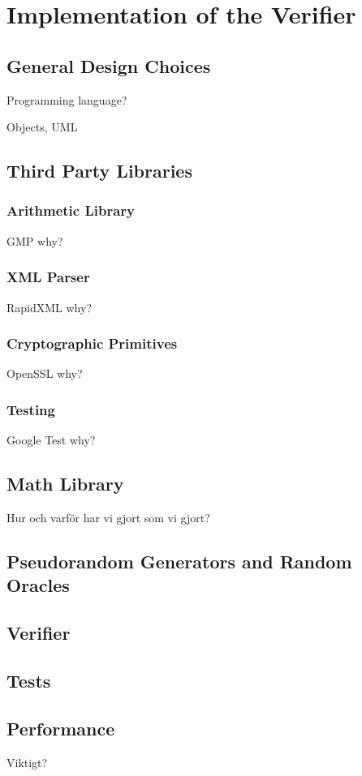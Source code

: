\section{Implementation of the Verifier}

\subsection{General Design Choices}

Programming language?

Objects, UML


\subsection{Third Party Libraries}

\subsubsection{Arithmetic Library}
GMP
why?

\subsubsection{XML Parser}
RapidXML
why?

\subsubsection{Cryptographic Primitives}
OpenSSL
why?

\subsubsection{Testing}
Google Test
why?

\subsection{Math Library}

Hur och varför har vi gjort som vi gjort?

\subsection{Pseudorandom Generators and Random Oracles}

\subsection{Verifier}

\subsection{Tests}

\subsection{Performance}

Viktigt?
